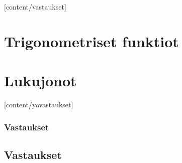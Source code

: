 \providecommand{\lukufilter}[2]{#2} %
\newcommand{\luku}[1]{\lukufilter{#1}{}} %

[content/vastaukset]

\chapter{Trigonometriset funktiot}


\chapter{Lukujonot}



\liitetyyli

[content/yovastaukset]
\luku{yotehtavia}
\subsection*{Vastaukset}


\section{Vastaukset} 
